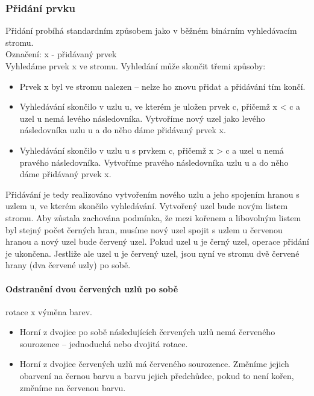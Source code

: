 \documentclass[10pt,a4paper]{article}
\begin{document}
\subsubsection{Přidání prvku}
Přidání probíhá standardním způsobem jako v běžném binárním vyhledávacím stromu. \\
Označení: x - přidávaný prvek \\
Vyhledáme prvek x ve stromu. Vyhledání může skončit třemi způsoby:
\begin{itemize}
	\item Prvek x byl ve stromu nalezen – nelze ho znovu přidat a přidávání tím končí.
	\item Vyhledávání skončilo v uzlu u, ve kterém je uložen prvek c, přičemž x < c a uzel u nemá levého následovníka. Vytvoříme nový uzel jako levého následovníka uzlu u a do něho dáme přidávaný prvek x.
	\item Vyhledávání skončilo v uzlu u s prvkem c, přičemž x > c a uzel u nemá pravého následovníka. Vytvoříme pravého následovníka uzlu u a do něho dáme přidávaný prvek x.
\end{itemize}
Přidávání je tedy realizováno vytvořením nového uzlu a jeho spojením hranou s uzlem u, ve kterém skončilo vyhledávání. Vytvořený uzel bude novým listem stromu. Aby zůstala zachována podmínka, že mezi kořenem a libovolným listem byl stejný počet černých hran, musíme nový uzel spojit s uzlem u červenou hranou a nový uzel bude červený uzel. Pokud uzel u je černý uzel, operace přidání je ukončena. Jestliže ale uzel u je červený uzel, jsou nyní ve stromu dvě červené hrany (dva červené uzly) po sobě.
\paragraph{Odstranění dvou červených uzlů po sobě}
rotace x výměna barev. \\
\begin{itemize}
	\item Horní z dvojice po sobě následujících červených uzlů nemá červeného sourozence – jednoduchá nebo dvojitá rotace.
	\item Horní z dvojice červených uzlů má červeného sourozence. Změníme jejich obarvení na černou barvu a barvu jejich předchůdce, pokud to není kořen, změníme na červenou barvu.
\end{itemize}
\end{document}
